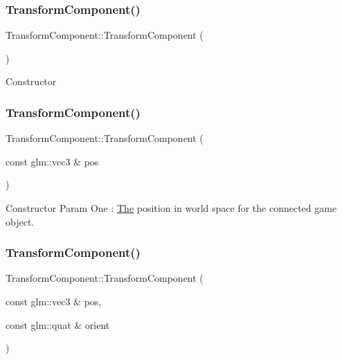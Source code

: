 \subsubsection{\texorpdfstring{Transform\+Component()}{TransformComponent()}\hspace{0.1cm}{\footnotesize\ttfamily [1/4]}}
{\footnotesize\ttfamily Transform\+Component\+::\+Transform\+Component (\begin{DoxyParamCaption}{ }\end{DoxyParamCaption})\hspace{0.3cm}{\ttfamily [inline]}}

Constructor \mbox{\label{class_transform_component_a01037615eda19c3bbb51c99094839574}} 
\subsubsection{\texorpdfstring{Transform\+Component()}{TransformComponent()}\hspace{0.1cm}{\footnotesize\ttfamily [2/4]}}
{\footnotesize\ttfamily Transform\+Component\+::\+Transform\+Component (\begin{DoxyParamCaption}\item[{const glm\+::vec3 \&}]{pos }\end{DoxyParamCaption})\hspace{0.3cm}{\ttfamily [inline]}}

Constructor Param One \+: \mbox{\hyperlink{class_the}{The}} position in world space for the connected game object. \mbox{\label{class_transform_component_a05ce9d2b5a350a5d8d67ce6b323818d4}} 
\subsubsection{\texorpdfstring{Transform\+Component()}{TransformComponent()}\hspace{0.1cm}{\footnotesize\ttfamily [3/4]}}
{\footnotesize\ttfamily Transform\+Component\+::\+Transform\+Component (\begin{DoxyParamCaption}\item[{const glm\+::vec3 \&}]{pos,  }\item[{const glm\+::quat \&}]{orient }\end{DoxyParamCaption})\hspace{0.3cm}{\ttfamily [inline]}}

